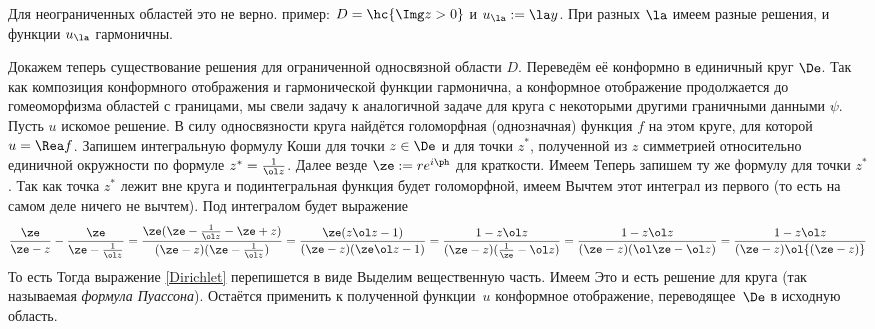 \documentclass[a4paper]{article}
\begin{document}
Для неограниченных областей это не верно. пример: $D = \hc{\Img  z > 0}$ и $u_\la :=\la y$. При разных
$\la$ имеем разные решения, и функции $u_\la$ гармоничны.

Докажем теперь существование решения для ограниченной односвязной области $D$.
Переведём её конформно в единичный круг $\De$. Так как композиция конформного отображения и гармонической
функции гармонична, а конформное отображение продолжается до гомеоморфизма областей с границами, мы свели
задачу к аналогичной задаче для круга с некоторыми другими граничными данными $\psi$. Пусть $u$\т
искомое решение. В силу односвязности круга найдётся голоморфная (однозначная) функция $f$ на этом круге,
для которой $u=\Rea f$. Запишем интегральную формулу Коши для точки $z\in \De$ и для точки $z^*$,
полученной из $z$ симметрией относительно единичной окружности по формуле $z^* = \frac{1}{\ol z}$.
Далее везде $\ze := re^{i\ph}$ для краткости. Имеем
Теперь запишем ту же формулу для точки $z^*$. Так как точка $z^*$ лежит вне круга и подинтегральная
функция будет голоморфной, имеем
Вычтем этот интеграл из первого (то есть на самом деле ничего не вычтем). Под интегралом будет выражение
$$
  \frac{\ze}{\ze-z}-\frac{\ze}{\ze - \frac{1}{\ol z}} =
  \frac{\ze(\ze - \frac{1}{\ol z} - \ze + z)} {(\ze - z)(\ze - \frac{1}{\ol z})} =
  \frac{\ze(z \ol z - 1)}{(\ze - z)(\ze \ol z - 1)} =
  \frac{1 - z \ol z} {(\ze - z)(\frac{1}{\ze} - \ol z)} =
  \frac{1 - z \ol z} {(\ze - z)(\ol \ze - \ol z)} =
  \frac{1 - z \ol z} {(\ze - z)\ol{(\ze - z)}}
$$
То есть
Тогда выражение \eqref{Dirichlet} перепишется в виде
Выделим вещественную часть. Имеем
Это и есть решение для круга (так называемая \emph{формула Пуассона}). Остаётся применить к полученной
функции~$u$ конформное отображение, переводящее~$\De$ в исходную область.
\end{document}
